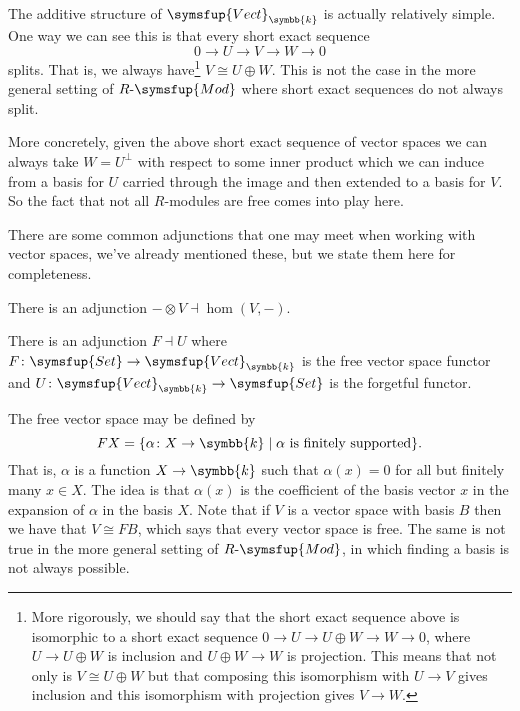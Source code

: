 \documentclass[fleqn]{NotesClass}
\makeatletter
\newcommand{\c@egory}[1]{\symsfup{#1}}
\newcommand{\Set}{\c@egory{Set}}
\newcommand{\Vect}[1][\field]{\c@egory{Vect}_{#1}}
\newcommand{\RMod}[1][R]{#1\text{-}\c@egory{Mod}}
\newcommand{\isomorphic}{\cong}
\renewcommand{\field}{\symbb{k}}
\newcommand{\leftadjointto}{\dashv}
\makeatother
\begin{document}
    The additive structure of \(\Vect\) is actually relatively simple.
    One way we can see this is that every short exact sequence
    \begin{equation}
        0 \to U \to V \to W \to 0
    \end{equation}
    splits.
    That is, we always have\footnote{More rigorously, we should say that the short exact sequence above is isomorphic to a short exact sequence \(0 \to U \to U \oplus W \to W \to 0\), where \(U \to U \oplus W\) is inclusion and \(U \oplus W \to W\) is projection. This means that not only is \(V \isomorphic U \oplus W\) but that composing this isomorphism with \(U \to V\) gives inclusion and this isomorphism with projection gives \(V \to W\).} \(V \isomorphic U \oplus W\).
    This is not the case in the more general setting of \(\RMod\) where short exact sequences do not always split.
    
    More concretely, given the above short exact sequence of vector spaces we can always take \(W = U^{\perp}\) with respect to some inner product which we can induce from a basis for \(U\) carried through the image and then extended to a basis for \(V\).
    So the fact that not all \(R\)-modules are free comes into play here.
    
    There are some common adjunctions that one may meet when working with vector spaces, we've already mentioned these, but we state them here for completeness.
    
    \begin{lma}{}{}
        There is an adjunction \(- \otimes V \leftadjointto \hom(V, -)\).
    \end{lma}
    
    \begin{lma}{}{}
        There is an adjunction \(F \leftadjointto U\) where \(F \colon \Set \to \Vect\) is the free vector space functor and \(U \colon \Vect \to \Set\) is the forgetful functor.
    \end{lma}
    
    The free vector space may be defined by
    \begin{equation}
        FX = \{\alpha \colon X \to \field \mid \alpha \text{ is finitely supported}\}.
    \end{equation}
    That is, \(\alpha\) is a function \(X \to \field\) such that \(\alpha(x) = 0\) for all but finitely many \(x \in X\).
    The idea is that \(\alpha(x)\) is the coefficient of the basis vector \(x\) in the expansion of \(\alpha\) in the basis \(X\).
    Note that if \(V\) is a vector space with basis \(B\) then we have that \(V \isomorphic FB\), which says that every vector space is free.
    The same is not true in the more general setting of \(\RMod\), in which finding a basis is not always possible.
    
\end{document}

